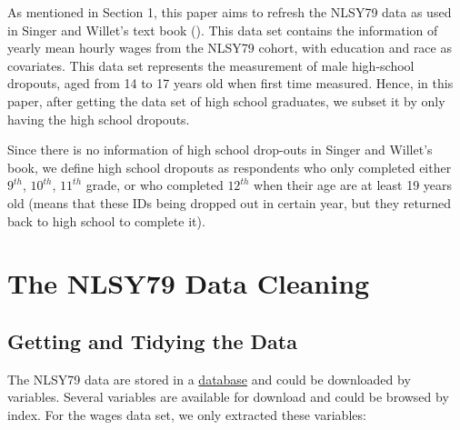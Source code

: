 As mentioned in Section 1, this paper aims to refresh the NLSY79 data as
used in Singer and Willet's text book (\citet{SingerJudithD2003Alda}).
This data set contains the information of yearly mean hourly wages from
the NLSY79 cohort, with education and race as covariates. This data set
represents the measurement of male high-school dropouts, aged from 14 to
17 years old when first time measured. Hence, in this paper, after
getting the data set of high school graduates, we subset it by only
having the high school dropouts.

Since there is no information of high school drop-outs in Singer and
Willet's book, we define high school dropouts as respondents who only
completed either \(9^{th}\), \(10^{th}\), \(11^{th}\) grade, or who
completed \(12^{th}\) when their age are at least 19 years old (means
that these IDs being dropped out in certain year, but they returned back
to high school to complete it).

\hypertarget{the-nlsy79-data-cleaning}{%
\section{The NLSY79 Data Cleaning}\label{the-nlsy79-data-cleaning}}

\hypertarget{getting-and-tidying-the-data}{%
\subsection{Getting and Tidying the
Data}\label{getting-and-tidying-the-data}}

The NLSY79 data are stored in a
\href{https://www.nlsinfo.org/content/cohorts/nlsy79/get-data}{database}
and could be downloaded by variables. Several variables are available
for download and could be browsed by index. For the wages data set, we
only extracted these variables:


